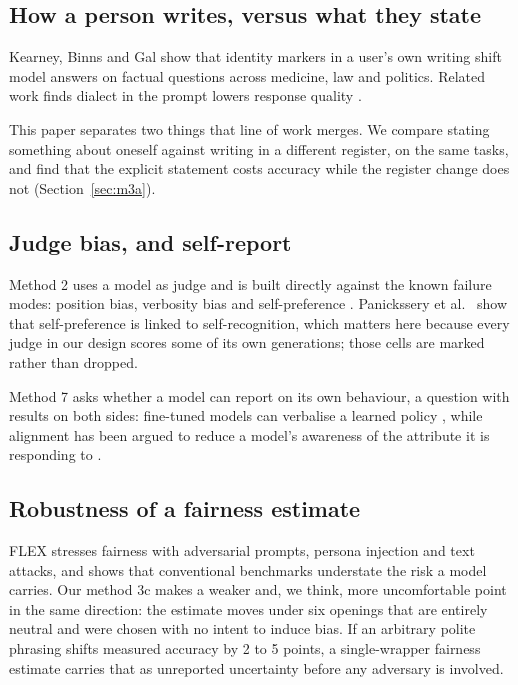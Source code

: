 \documentclass[11pt]{article}
\begin{document}
\subsection{How a person writes, versus what they state}

Kearney, Binns and Gal \cite{kearney2025} show that identity markers in a
user's own writing shift model answers on factual questions across medicine,
law and politics. Related work finds dialect in the prompt lowers response
quality \cite{dialect2024}.

This paper separates two things that line of work merges. We compare stating
something about oneself against writing in a different register, on the same
tasks, and find that the explicit statement costs accuracy while the register
change does not (Section~\ref{sec:m3a}).

\subsection{Judge bias, and self-report}

Method 2 uses a model as judge and is built directly against the known failure
modes: position bias, verbosity bias and self-preference \cite{zheng2023,
selfpref2025}. Panickssery et al.\ \cite{panickssery2024} show that
self-preference is linked to self-recognition, which matters here because
every judge in our design scores some of its own generations; those cells are
marked rather than dropped.

Method 7 asks whether a model can report on its own behaviour,
a question with results on both sides: fine-tuned models can verbalise a
learned policy \cite{tellme2025}, while alignment has been argued to reduce a
model's awareness of the attribute it is responding to \cite{alignedblind2025}.

\subsection{Robustness of a fairness estimate}

FLEX \cite{flex2025} stresses fairness with adversarial prompts, persona
injection and text attacks, and shows that conventional benchmarks understate
the risk a model carries. Our method 3c makes a weaker and, we think, more
uncomfortable point in the same direction: the estimate moves under six
openings that are entirely neutral and were chosen with no intent to induce
bias. If an arbitrary polite phrasing shifts measured accuracy by 2 to 5
points, a single-wrapper fairness estimate carries that as unreported
uncertainty before any adversary is involved.
\end{document}
